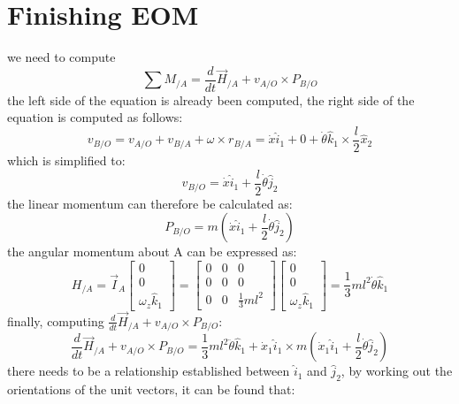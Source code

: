 \section{Finishing EOM}

we need to compute
\begin{equation}
\sum M_{/A} = \frac{d}{dt}\vec{H}_{/A}  + v_{A/O} \times P_{B/O}
\end{equation}
the left side of the equation is already been computed, the right side of the equation is computed as follows:
\begin{equation}
	v_{B/O} = v_{A/O} + v_{B/A} + \omega \times r_{B/A} = \dot{x}\hat{i}_{1} + 0 + \dot{\theta}\hat{k}_{1} \times \frac{l}{2}\hat{x}_{2}
\end{equation}
which is simplified to:
\begin{equation}
v_{B/O} = \dot{x}\hat{i}_{1} + \frac{l}{2}\dot{\theta} \hat{j}_{2}
\end{equation}
the linear momentum can therefore be calculated as:
\begin{equation}
	P_{B/O} = m \left( \dot{x}\hat{i}_{1} + \frac{l}{2}\dot{\theta} \hat{j}_{2} \right)
\end{equation}
the angular momentum about A can be expressed as:
\begin{equation}
	H_{/A} = \vec{I}_{A} \begin{bmatrix}
		0 \\ 0 \\ \omega_{z}\hat{k}_{1}
	\end{bmatrix} = \begin{bmatrix}
	0 & 0 & 0 \\ 0 & 0 & 0 \\ 0 & 0 & \frac{1}{3}m l^{2}
	\end{bmatrix}\begin{bmatrix}
	0 \\ 0 \\ \omega_{z}\hat{k}_{1}
	\end{bmatrix} = \frac{1}{3}m l ^{2} \dot{\theta} \hat{k}_{1}
\end{equation}
finally, computing $\frac{d}{dt}\vec{H}_{/A}  + v_{A/O} \times P_{B/O}$:
\begin{equation}
	\frac{d}{dt}\vec{H}_{/A}  + v_{A/O} \times P_{B/O} = \frac{1}{3}m l ^{2} \ddot{\theta} \hat{k}_{1} + \dot{x}_{1}\hat{i}_{1} \times m \left( \dot{x}_{1}\hat{i}_{1} + \frac{l}{2}\dot{\theta} \hat{j}_{2} \right)
\end{equation}
there needs to be a relationship established between $\hat{i}_{1}$ and $\hat{j}_{2}$, by working out the orientations of the unit vectors, it can be found that:
